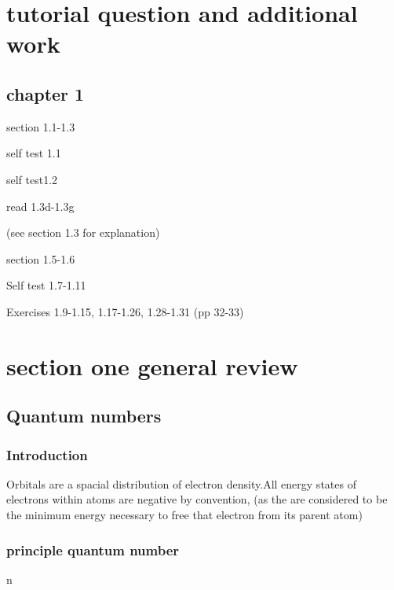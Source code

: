 \documentclass[]{article}
\date{}
\begin{document}
\hypertarget{tutorial-question-and-additional-work}{%
\section{tutorial question and additional
work}\label{tutorial-question-and-additional-work}}

\hypertarget{chapter-1}{%
\subsection{chapter 1}\label{chapter-1}}

section 1.1-1.3

self test 1.1

self test1.2

read 1.3d-1.3g

(see section 1.3 for explanation)

section 1.5-1.6

Self test 1.7-1.11

Exercises 1.9-1.15, 1.17-1.26, 1.28-1.31 (pp 32-33)

\hypertarget{section-one-general-review}{%
\section{section one general review}\label{section-one-general-review}}

\hypertarget{quantum-numbers}{%
\subsection{Quantum numbers}\label{quantum-numbers}}

\hypertarget{introduction}{%
\subsubsection{Introduction}\label{introduction}}

Orbitals are a spacial distribution of electron density.All energy
states of electrons within atoms are negative by convention, (as the are
considered to be the minimum energy necessary to free that electron from
its parent atom)

\hypertarget{principle-quantum-number}{%
\subsubsection{principle quantum
number}\label{principle-quantum-number}}

n
\end{document}
